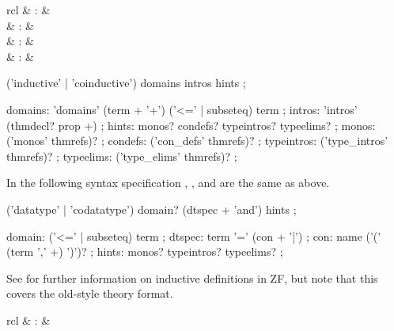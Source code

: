 \begin{isabellebody}
\begin{isamarkuptext}
  \begin{matharray}{rcl}
    \mbox{} & : &  \\
    \mbox{} & : &  \\
    \mbox{} & : &  \\
    \mbox{} & : &  \\
  \end{matharray}

  \begin{rail}
    ('inductive' | 'coinductive') domains intros hints
    ;

    domains: 'domains' (term + '+') ('<=' | subseteq) term
    ;
    intros: 'intros' (thmdecl? prop +)
    ;
    hints: monos? condefs? typeintros? typeelims?
    ;
    monos: ('monos' thmrefs)?
    ;
    condefs: ('con\_defs' thmrefs)?
    ;
    typeintros: ('type\_intros' thmrefs)?
    ;
    typeelims: ('type\_elims' thmrefs)?
    ;
  \end{rail}

  In the following syntax specification , , and  are the same as above.

  \begin{rail}
    ('datatype' | 'codatatype') domain? (dtspec + 'and') hints
    ;

    domain: ('<=' | subseteq) term
    ;
    dtspec: term '=' (con + '|')
    ;
    con: name ('(' (term ',' +) ')')?  
    ;
    hints: monos? typeintros? typeelims?
    ;
  \end{rail}

  See \cite{isabelle-ZF} for further information on inductive
  definitions in ZF, but note that this covers the old-style theory
  format.%
\end{isamarkuptext}%
\isamarkuptrue%
%
\isamarkuptrue%
%
\begin{isamarkuptext}%
\begin{matharray}{rcl}
    \mbox{} & : &  \\
  \end{matharray}


\end{isamarkuptext}
\end{isabellebody}
